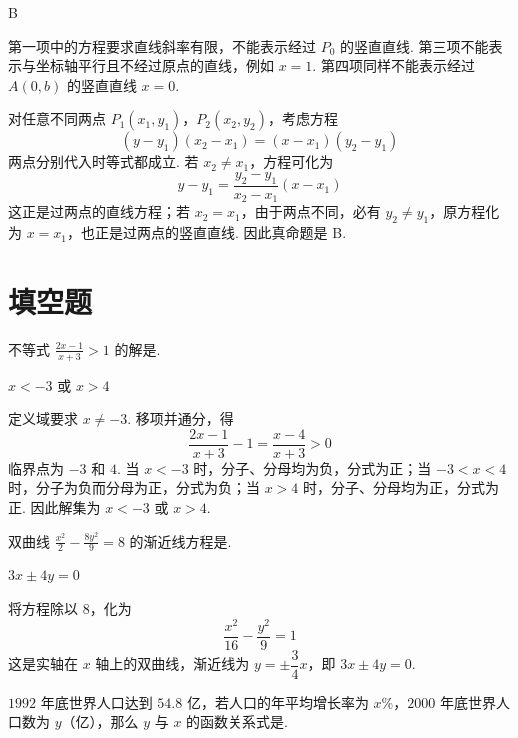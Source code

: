 \documentclass[UTF8,a4paper,oneside,11pt]{ctexbook}
\begin{document}
\begin{answer}
B
\end{answer}

\begin{solution}
第一项中的方程要求直线斜率有限，不能表示经过 \(P_0\) 的竖直直线. 第三项不能表示与坐标轴平行且不经过原点的直线，例如 \(x=1\). 第四项同样不能表示经过 \(A(0,b)\) 的竖直直线 \(x=0\).

对任意不同两点 \(P_1(x_1,y_1)\)，\(P_2(x_2,y_2)\)，考虑方程
\[
(y-y_1)(x_2-x_1)=(x-x_1)(y_2-y_1)
\]
两点分别代入时等式都成立. 若 \(x_2\ne x_1\)，方程可化为
\[
y-y_1=\frac{y_2-y_1}{x_2-x_1}(x-x_1)
\]
这正是过两点的直线方程；若 \(x_2=x_1\)，由于两点不同，必有 \(y_2\ne y_1\)，原方程化为 \(x=x_1\)，也正是过两点的竖直直线. 因此真命题是 B.
\end{solution}

\section{填空题}

\begin{problem}
不等式 \(\frac{2x-1}{x+3}>1 \) 的解是\fillinblank{}.
\end{problem}

\begin{answer}
\(x<-3\) 或 \(x>4\)
\end{answer}

\begin{solution}
定义域要求 \(x\ne-3\). 移项并通分，得
\[
\frac{2x-1}{x+3}-1=\frac{x-4}{x+3}>0
\]
临界点为 \(-3\) 和 \(4\). 当 \(x<-3\) 时，分子、分母均为负，分式为正；当 \(-3<x<4\) 时，分子为负而分母为正，分式为负；当 \(x>4\) 时，分子、分母均为正，分式为正. 因此解集为 \(x<-3\) 或 \(x>4\).
\end{solution}

\begin{problem}
双曲线 \(\frac{x^{2}}{2}-\frac{8y^{2}}{9}=8 \) 的渐近线方程是\fillinblank{}.
\end{problem}

\begin{answer}
\(3x\pm4y=0\)
\end{answer}

\begin{solution}
将方程除以 \(8\)，化为
\[
\frac{x^2}{16}-\frac{y^2}{9}=1
\]
这是实轴在 \(x\) 轴上的双曲线，渐近线为 \(y=\pm\dfrac{3}{4}x\)，即 \(3x\pm4y=0\).
\end{solution}

\begin{problem}
\(1992\) 年底世界人口达到 \(54.8\text{ 亿}\)，若人口的年平均增长率为 \(x\%\)，\(2000\) 年底世界人口数为 \(y\)（\(\text{亿}\)），那么 \(y\) 与 \(x\) 的函数关系式是\fillinblank{}.
\end{problem}
\end{document}
